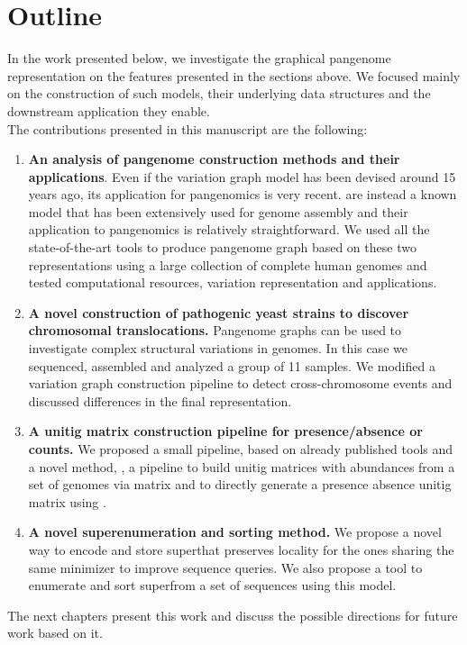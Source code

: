\section{Outline}
In the work presented below, we investigate the graphical pangenome representation on the features presented in the sections above. We focused mainly on the construction of such models, their underlying data structures and the downstream application they enable.\\
The contributions presented in this manuscript are the following:
\begin{enumerate}
	\item \textbf{An analysis of pangenome construction methods and their applications}. Even if the variation graph model has been devised around 15 years ago, its application for pangenomics is very recent. \dbgs are instead a known model that has been extensively used for genome assembly and their application to pangenomics is relatively straightforward. We used all the state-of-the-art tools to produce pangenome graph based on these two representations using a large collection of complete human genomes and tested computational resources, variation representation and applications.
	\item  \textbf{A novel construction of pathogenic yeast strains to discover chromosomal translocations.} Pangenome graphs can be used to investigate complex structural variations in genomes. In this case we sequenced, assembled and analyzed a group of 11 samples. We modified a variation graph construction pipeline to detect cross-chromosome events and discussed differences in the final representation.
	\item \textbf{A unitig matrix construction pipeline for presence/absence or counts.} We proposed a small pipeline, based on already published tools and a novel method, \kmat, a pipeline to build unitig matrices with abundances from a set of genomes via \kmer matrix and to directly generate a presence absence unitig matrix using \ccdbgs. 
	\item  \textbf{A novel super\kmers enumeration and sorting method.} We propose a novel way to encode and store super\kmers that preserves locality for the ones sharing the same minimizer to improve sequence queries. We also propose a tool to enumerate and sort super\kmers from a set of sequences using this model.
\end{enumerate}

The next chapters present this work and discuss the possible directions for future work based on it.

\printbibliography